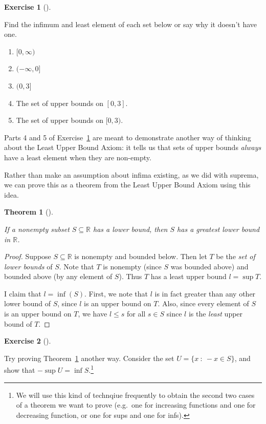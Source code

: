 \documentclass[
  letterpaper,
  DIV=11,
  numbers=noendperiod]{scrreprt}
\providecommand{\tightlist}{%
  \setlength{\itemsep}{0pt}\setlength{\parskip}{0pt}}
\def\R{\mathbb R}
\newcommand{\st}{~:~}
\theoremstyle{plain}
\newtheorem{theorem}{Theorem}[chapter]
\theoremstyle{definition}
\newtheorem{exercise}{Exercise}[chapter]
\theoremstyle{plain}
\theoremstyle{plain}
\theoremstyle{definition}
\theoremstyle{definition}
\theoremstyle{remark}
\begin{document}
\begin{exercise}[]\protect\hypertarget{exr-inf-examples}{}\label{exr-inf-examples}

Find the infimum and least element of each set below or say why it
doesn't have one.

\begin{enumerate}
\def\labelenumi{\arabic{enumi}.}
\tightlist
\item
  \([0,\infty)\)
\item
  \((-\infty,0]\)
\item
  \((0,3]\)
\item
  The set of upper bounds on \([0,3]\).
\item
  The set of upper bounds on \([0,3)\).
\end{enumerate}

\end{exercise}

Parts 4 and 5 of Exercise~\ref{exr-inf-examples} are meant to
demonstrate another way of thinking about the Least Upper Bound Axiom:
it tells us that sets of upper bounds \emph{always} have a least element
when they are non-empty.

Rather than make an assumption about infima existing, as we did with
suprema, we can prove this as a theorem from the Least Upper Bound Axiom
using this idea.

\begin{theorem}[]\protect\hypertarget{thm-infs-exist}{}\label{thm-infs-exist}

If a nonempty subset \(S\subseteq\R\) has a lower bound, then \(S\) has
a greatest lower bound in \(\R\).

\end{theorem}

\begin{proof}
Suppose \(S\subseteq\R\) is nonempty and bounded below. Then let \(T\)
be the \emph{set of lower bounds} of \(S\). Note that \(T\) is nonempty
(since \(S\) was bounded above) and bounded above (by any element of
\(S\)). Thus \(T\) has a least upper bound \(l=\sup T\).

I claim that \(l=\inf(S)\). First, we note that \(l\) is in fact greater
than any other lower bound of \(S\), since \(l\) is an upper bound on
\(T\). Also, since every element of \(S\) is an upper bound on \(T\), we
have \(l\leq s\) for all \(s\in S\) since \(l\) is the \emph{least}
upper bound of \(T\).
\end{proof}

\begin{exercise}[]\protect\hypertarget{exr-infs-exist-2}{}\label{exr-infs-exist-2}

Try proving Theorem~\ref{thm-infs-exist} another way. Consider the set
\(U=\{x\st -x\in S\}\), and show that \(-\sup U=\inf S\).\footnote{We
  will use this kind of technqiue frequently to obtain the second two
  cases of a theorem we want to prove (e.g.~one for increasing functions
  and one for decreasing function, or one for sups and one for infs).}

\end{exercise}
\end{document}

